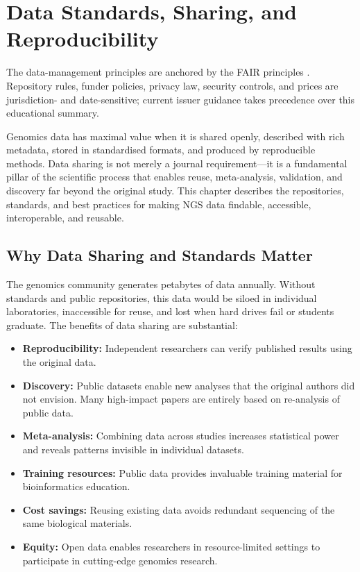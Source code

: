\chapter{Data Standards, Sharing, and Reproducibility}
\label{ch:datastandards}

\begin{sourcebox}
The data-management principles are anchored by the FAIR principles \cite{wilkinson2016}. Repository rules, funder policies, privacy law, security controls, and prices are jurisdiction- and date-sensitive; current issuer guidance takes precedence over this educational summary.
\end{sourcebox}

\begin{keyconcept}
Genomics data has maximal value when it is shared openly, described with rich metadata, stored in standardised formats, and produced by reproducible methods. Data sharing is not merely a journal requirement---it is a fundamental pillar of the scientific process that enables reuse, meta-analysis, validation, and discovery far beyond the original study. This chapter describes the repositories, standards, and best practices for making NGS data findable, accessible, interoperable, and reusable.
\end{keyconcept}

\section{Why Data Sharing and Standards Matter}
\label{sec:datastandards:why}

The genomics community generates petabytes of data annually. Without standards and public repositories, this data would be siloed in individual laboratories, inaccessible for reuse, and lost when hard drives fail or students graduate. The benefits of data sharing are substantial:

\begin{itemize}[itemsep=2pt]
  \item \textbf{Reproducibility:} Independent researchers can verify published results using the original data.
  \item \textbf{Discovery:} Public datasets enable new analyses that the original authors did not envision. Many high-impact papers are entirely based on re-analysis of public data.
  \item \textbf{Meta-analysis:} Combining data across studies increases statistical power and reveals patterns invisible in individual datasets.
  \item \textbf{Training resources:} Public data provides invaluable training material for bioinformatics education.
  \item \textbf{Cost savings:} Reusing existing data avoids redundant sequencing of the same biological materials.
  \item \textbf{Equity:} Open data enables researchers in resource-limited settings to participate in cutting-edge genomics research.
\end{itemize}

